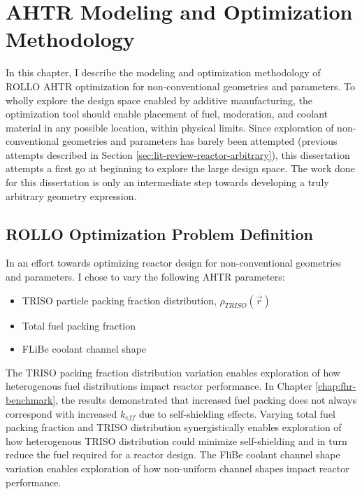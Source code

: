 \chapter{AHTR Modeling and Optimization Methodology}
In this chapter, I describe the modeling and optimization methodology of
\gls{ROLLO} \gls{AHTR} optimization for non-conventional geometries and parameters.
To wholly explore the design space enabled by additive manufacturing, the 
optimization tool should enable placement of fuel, moderation, and coolant material 
in any possible location, within physical limits. 
Since exploration of non-conventional geometries and parameters has barely been
attempted (previous attempts described in Section \ref{sec:lit-review-reactor-arbitrary}), 
this dissertation attempts a first go at beginning to explore the large design space.  
The work done for this dissertation is only an intermediate step towards developing 
a truly arbitrary geometry expression. 


\section{ROLLO Optimization Problem Definition}
\label{sec:opt-problem}
In an effort towards optimizing reactor design for non-conventional geometries 
and parameters.
I chose to vary the following \gls{AHTR} parameters: 
\begin{itemize}
    \item \gls{TRISO} particle packing fraction distribution, 
    $\rho_{TRISO}(\vec{r})$
    \item Total fuel packing fraction
    \item \gls{FLiBe} coolant channel shape 
\end{itemize} 
The TRISO packing fraction distribution variation enables exploration of how 
heterogenous fuel distributions impact reactor performance.
In Chapter \ref{chap:fhr-benchmark}, the results demonstrated that increased fuel 
packing does not always correspond with increased $k_{eff}$ due to self-shielding
effects. 
Varying total fuel packing fraction and TRISO distribution synergistically enables exploration of
how heterogenous TRISO distribution could minimize self-shielding and in turn reduce the fuel 
required for a reactor design. 
The FliBe coolant channel shape variation enables exploration of how non-uniform 
channel shapes impact reactor performance. 

